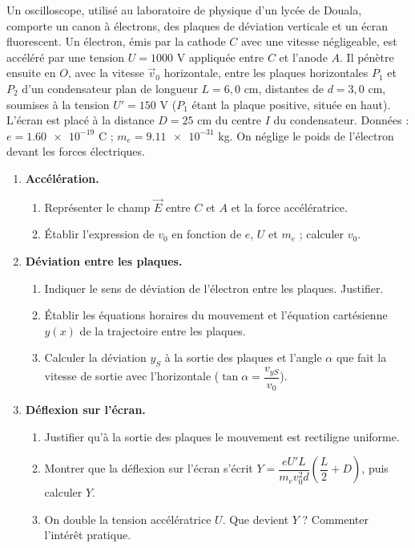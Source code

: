 \documentclass[11pt]{article}
\begin{document}
\begin{exercice}
Un oscilloscope, utilisé au laboratoire de physique d'un lycée de Douala, comporte un canon à électrons, des plaques de déviation verticale et un écran fluorescent. Un électron, émis par la cathode $C$ avec une vitesse négligeable, est accéléré par une tension $U = 1000$ V appliquée entre $C$ et l'anode $A$. Il pénètre ensuite en $O$, avec la vitesse $\vec{v}_0$ horizontale, entre les plaques horizontales $P_1$ et $P_2$ d'un condensateur plan de longueur $L = 6{,}0$ cm, distantes de $d = 3{,}0$ cm, soumises à la tension $U' = 150$ V ($P_1$ étant la plaque positive, située en haut). L'écran est placé à la distance $D = 25$ cm du centre $I$ du condensateur.
Données : $e = \num{1,60e-19}$ C ; $m_e = \num{9,11e-31}$ kg. On néglige le poids de l'électron devant les forces électriques.
\begin{enumerate}
\item \textbf{Accélération.}
\begin{enumerate}
\item Représenter le champ $\vec{E}$ entre $C$ et $A$ et la force accélératrice.
\item Établir l'expression de $v_0$ en fonction de $e$, $U$ et $m_e$ ; calculer $v_0$.
\end{enumerate}
\item \textbf{Déviation entre les plaques.}
\begin{enumerate}
\item Indiquer le sens de déviation de l'électron entre les plaques. Justifier.
\item Établir les équations horaires du mouvement et l'équation cartésienne $y(x)$ de la trajectoire entre les plaques.
\item Calculer la déviation $y_S$ à la sortie des plaques et l'angle $\alpha$ que fait la vitesse de sortie avec l'horizontale ($\tan\alpha = \dfrac{v_{yS}}{v_0}$).
\end{enumerate}
\item \textbf{Déflexion sur l'écran.}
\begin{enumerate}
\item Justifier qu'à la sortie des plaques le mouvement est rectiligne uniforme.
\item Montrer que la déflexion sur l'écran s'écrit $Y = \dfrac{eU'L}{m_e v_0^2 d}\left(\dfrac{L}{2} + D\right)$, puis calculer $Y$.
\item On double la tension accélératrice $U$. Que devient $Y$ ? Commenter l'intérêt pratique.
\end{enumerate}
\end{enumerate}
\end{exercice}
\end{document}

